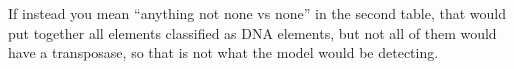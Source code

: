 \documentclass[12pt]{article}
\begin{document}
If instead you mean “anything not none vs none” in the second table, that would put together all elements classified as DNA elements, but not all of them would have a transposase, so that is not what the model would be detecting.

\fi


\iffalse
%
%
\end{document}
